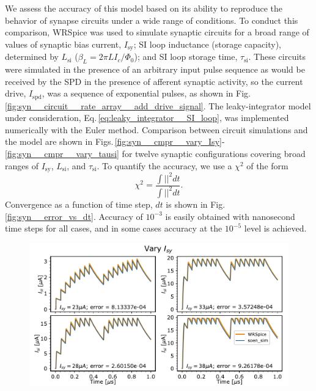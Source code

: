 \documentclass[twocolumn]{article}
\begin{document}
We assess the accuracy of this model based on its ability to reproduce the behavior of synapse circuits under a wide range of conditions. To conduct this comparison, WRSpice was used to simulate synaptic circuits for a broad range of values of synaptic bias current, $I_{\mathrm{sy}}$; SI loop inductance (storage capacity), determined by $L_{\mathrm{si}}$ ($\beta_L = 2\pi L I_c/\Phi_0$); and SI loop storage time, $\tau_{\mathrm{si}}$. These circuits were simulated in the presence of an arbitrary input pulse sequence as would be received by the SPD in the presence of afferent synaptic activity, so the current drive, $I_{\mathrm{spd}}$, was a sequence of exponential pulses, as shown in Fig.\,\ref{fig:syn__circuit__rate_array__add_drive_signal}. The leaky-integrator model under consideration, Eq.\,\ref{eq:leaky_integrator__SI_loop}, was implemented numerically with the Euler method. Comparison between circuit simulations and the model are shown in Figs.\,\ref{fig:syn__cmpr__vary_Isy}-\ref{fig:syn__cmpr__vary_tausi} for twelve synaptic configurations covering broad ranges of $I_{\mathrm{sy}}$, $L_{\mathrm{si}}$, and $\tau_{\mathrm{si}}$. To quantify the accuracy, we use a $\chi^2$ of the form
\begin{equation}
\label{eq:chi_squared}
\chi^2 = \frac{\int \left| \right|^2 dt}{\int \left| \right|^2 dt}.
\end{equation}
Convergence as a function of time step, $dt$ is shown in Fig.\,\ref{fig:syn__error_vs_dt}. Accuracy of $10^{-3}$ is easily obtained with nanosecond time steps for all cases, and in some cases accuracy at the $10^{-5}$ level is achieved. 



\begin{figure}[h!]
\includegraphics[width=17.2cm]{figures/_04__syn__cmpr__vary_Isy.pdf}
\end{figure}
\end{document}
